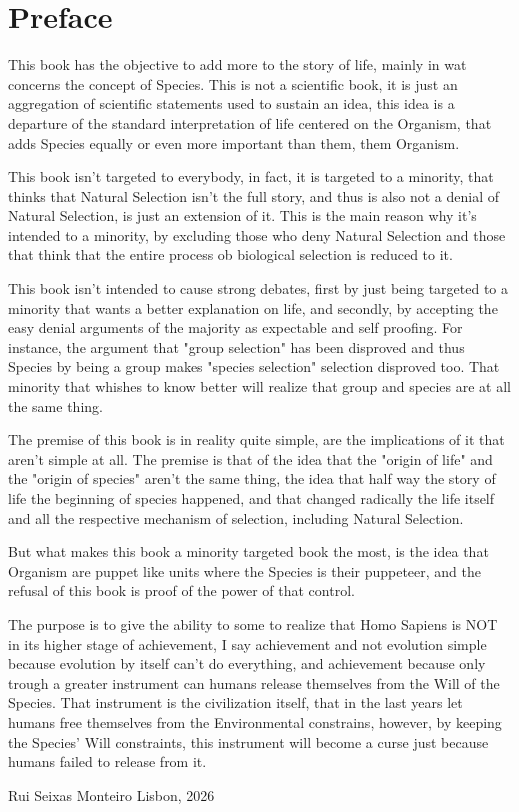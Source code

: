 \chapter{Preface}

This book has the objective to add more to the story of life, mainly in wat concerns the concept of Species.
This is not a scientific book, it is just an aggregation of scientific statements used to sustain an idea,
this idea is a departure of the standard interpretation of life centered on the Organism, that adds Species
equally or even more important than them, them Organism.

This book isn't targeted to everybody, in fact, it is targeted to a minority, that thinks that Natural Selection
isn't the full story, and thus is also not a denial of Natural Selection, is just an extension of it. This is
the main reason why it's intended to a minority, by excluding those who deny Natural Selection and those
that think that the entire process ob biological selection is reduced to it.

This book isn't intended to cause strong debates, first by just being targeted to a minority that wants a better
explanation on life, and secondly, by accepting the easy denial arguments of the majority as expectable and self
proofing. For instance, the argument that "group selection" has been disproved and thus Species by being a group
makes "species selection" selection disproved too. That minority that whishes to know better will realize that
group and species are at all the same thing.

The premise of this book is in reality quite simple, are the implications of it that aren't simple at all.
The premise is that of the idea that the "origin of life" and the "origin of species" aren't the same thing,
the idea that half way the story of life the beginning of species happened, and that changed radically the
life itself and all the respective mechanism of selection, including Natural Selection.

But what makes this book a minority targeted book the most, is the idea that Organism are puppet like units
where the Species is their puppeteer, and the refusal of this book is proof of the power of that control.

The purpose is to give the ability to some to realize that Homo Sapiens is NOT in its higher stage of achievement,
I say achievement and not evolution simple because evolution by itself can't do everything, and achievement because
only trough a greater instrument can humans release themselves from the Will of the Species. That instrument
is the civilization itself, that in the last years let humans free themselves from the Environmental constrains,
however, by keeping the Species' Will constraints, this instrument will become a curse just because
humans failed to release from it.

Rui Seixas Monteiro
Lisbon, 2026